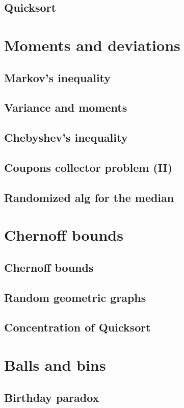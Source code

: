 \documentclass{book}
\begin{document}
\section{Quicksort}

\chapter{Moments and deviations}
\section{Markov's inequality}
\section{Variance and moments}
\section{Chebyshev's inequality}
\section{Coupons collector problem (II)}
\section{Randomized alg for the median}

\chapter{Chernoff bounds}
\section{Chernoff bounds}
\section{Random geometric graphs}
\section{Concentration of Quicksort}

\chapter{Balls and bins}
\section{Birthday paradox}
\end{document}
